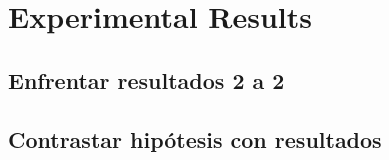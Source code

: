 
\chapter{Experimental Results} %

\label{Chapter4} %


\begin{note}
  \section{Enfrentar resultados 2 a 2}
\end{note}
\begin{note}
  \section{Contrastar hipótesis con resultados}
\end{note}
